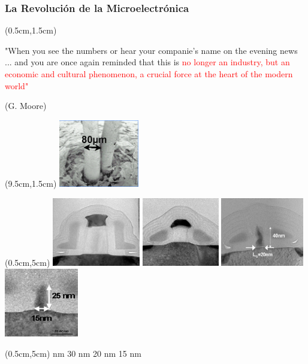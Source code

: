 \documentclass[t,aspectratio=169,10pt]{beamer}
\begin{document}
\begin{frame}
\frametitle{La Revolución de la Microelectrónica}
\begin{textblock*}{7cm}(0.5cm,1.5cm)
	\raggedright
	"When you see the numbers or hear your companie's name on the evening news ... and you are once again reminded that this is \textcolor{red}{no longer an industry, but an economic and cultural phenomenon, a crucial force at the heart of the modern world"}
	
	\raggedleft (G. Moore)
\end{textblock*}

\begin{textblock*}{3.5cm}(9.5cm,1.5cm)
	\includegraphics[width=3.5cm]{revolution1}
\end{textblock*}

\begin{textblock*}{15cm}(0.5cm,5cm)
	\centering
	\includegraphics[height=3cm]{revolution2} \includegraphics[height=3cm]{revolution3} \includegraphics[height=3cm]{revolution4} \includegraphics[height=3cm]{revolution5}
\end{textblock*}

\begin{textblock*}{15cm}(0.5cm,5cm)
	 nm \hspace{3cm} 30 nm \hspace{3 cm} 20 nm \hspace{3cm} 15 nm
\end{textblock*}

\end{frame}
\end{document}
